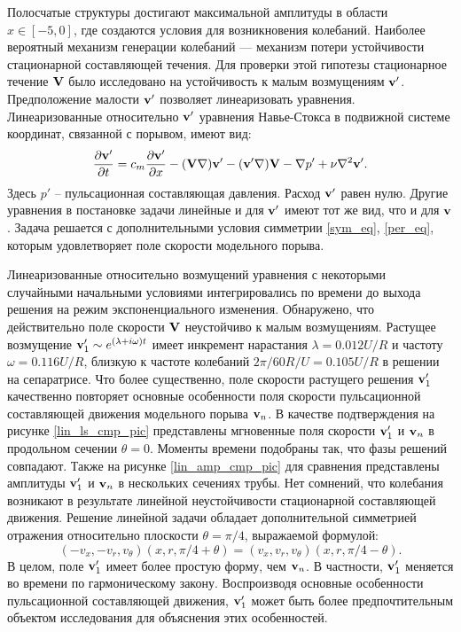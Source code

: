 Полосчатые структуры достигают максимальной амплитуды в области $x\in[-5,0]$, где создаются условия для возникновения колебаний. Наиболее вероятный механизм генерации колебаний --- механизм потери устойчивости стационарной составляющей течения. Для проверки этой гипотезы стационарное течение $\mathbf{V}$ было исследовано на устойчивость к малым возмущениям $\mathbf{v}'$. Предположение малости $\mathbf{v}'$ позволяет линеаризовать уравнения. Линеаризованные относительно $\mathbf{v}'$ уравнения Навье-Стокса в подвижной системе координат, связанной с порывом, имеют вид:
\begin{equation} \label{lin_eq}
\frac{\partial \mathbf{v}'}{\partial t} = c_m \frac{\partial \mathbf{v}'}{\partial x} - (\mathbf{V} \nabla) \mathbf{v}' - (\mathbf{v}' \nabla) \mathbf{V} - \nabla p' + \nu \nabla^2 \mathbf{v}'. 
\end{equation}
Здесь $p'$ -- пульсационная составляющая давления. Расход $\mathbf{v}'$ равен нулю. Другие уравнения в постановке задачи линейные и для $\mathbf{v}'$ имеют тот же вид, что и для $\mathbf{v}$. Задача решается с дополнительными условия симметрии \eqref{sym_eq}, \eqref{per_eq}, которым удовлетворяет поле скорости модельного порыва. 

Линеаризованные относительно возмущений уравнения с некоторыми случайными начальными условиями интегрировались по времени до выхода решения на режим экспоненциального изменения. Обнаружено, что действительно поле скорости $\mathbf{V}$ неустойчиво к малым возмущениям. Растущее возмущение $\mathbf{v}'_1 \sim e^{(\lambda+i\omega)t}$ имеет инкремент нарастания $\lambda=0.012U/R$ и частоту $\omega=0.116U/R$, близкую к частоте колебаний $2\pi/60R/U=0.105U/R$ в решении на сепаратрисе. Что более существенно, поле скорости растущего решения $\mathbf{v}'_1$ качественно повторяет основные особенности поля скорости пульсационной составляющей движения модельного порыва $\mathbf{v}_n$. В качестве подтверждения на рисунке \ref{lin_ls_cmp_pic} представлены мгновенные поля скорости $\mathbf{v}'_1$ и $\mathbf{v}_n$ в продольном сечении $\theta = 0$. Моменты времени подобраны так, что фазы решений совпадают. Также на рисунке \ref{lin_amp_cmp_pic} для сравнения представлены амплитуды $\mathbf{v}_1'$ и $\mathbf{v}_n$ в нескольких сечениях трубы. Нет сомнений, что колебания возникают в результате линейной неустойчивости стационарной составляющей движения. Решение линейной задачи обладает дополнительной симметрией отражения относительно плоскости $\theta = \pi/4$, выражаемой формулой:
\begin{equation} \label{dop_sym_eq}
(-v_x, -v_r, v_\theta)(x, r, \pi/4 + \theta) = (v_x, v_r, v_\theta)(x, r, \pi/4 - \theta). 
\end{equation} 
В целом, поле $\mathbf{v}'_1$ имеет более простую форму, чем $\mathbf{v}_n$. В частности, $\mathbf{v}'_1$ меняется во времени по гармоническому закону. Воспроизводя основные особенности пульсационной составляющей движения, $\mathbf{v}'_1$ может быть более предпочтительным объектом исследования для объяснения этих особенностей. 

